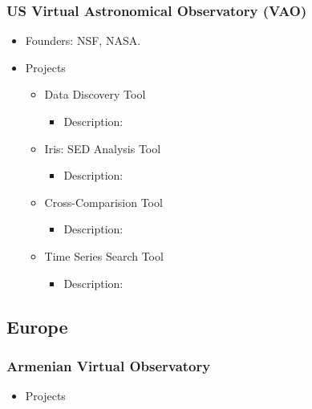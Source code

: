 \documentclass[11pt]{article}
\begin{document}
             \subsubsection{US Virtual Astronomical Observatory (VAO)}
                  \begin{itemize}
                      \item Founders: NSF, NASA.
                      \item Projects
                          \begin{itemize}
                              \item Data Discovery Tool
                                  \begin{itemize}
                                      \item Description: 
                                  \end{itemize}
                              \item Iris: SED Analysis Tool
                                  \begin{itemize}
                                      \item Description: 
                                  \end{itemize}
                              \item Cross-Comparision Tool
                                  \begin{itemize}
                                      \item Description: 
                                  \end{itemize}
                              \item Time Series Search Tool
                                  \begin{itemize}
                                      \item Description: 
                                  \end{itemize}
                          \end{itemize}
                  \end{itemize}

          \subsection{Europe}
              \subsubsection{Armenian Virtual Observatory}
                  \begin{itemize}
                      \item Projects
                  \end{itemize}
\end{document}
